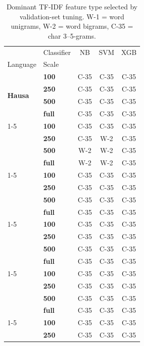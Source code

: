 \begin{table}[t]
\caption{Dominant TF-IDF feature type selected by validation-set tuning. W-1 = word unigrams, W-2 = word bigrams, C-35 = char 3--5-grams.}
\label{tab:feature_wins}
\begin{tabular}{llccc}
\toprule
 & Classifier & NB & SVM & XGB \\
Language & Scale &  &  &  \\
\midrule
\multirow[t]{4}{*}{\textbf{Hausa}} & \textbf{100} & C-35 & C-35 & C-35 \\
\textbf{} & \textbf{250} & C-35 & C-35 & C-35 \\
\textbf{} & \textbf{500} & C-35 & C-35 & C-35 \\
\textbf{} & \textbf{full} & C-35 & C-35 & C-35 \\
\cline{1-5}
\multirow[t]{4}{*}{\textbf{Igbo}} & \textbf{100} & C-35 & C-35 & C-35 \\
\textbf{} & \textbf{250} & C-35 & W-2 & C-35 \\
\textbf{} & \textbf{500} & W-2 & W-2 & C-35 \\
\textbf{} & \textbf{full} & W-2 & W-2 & C-35 \\
\cline{1-5}
\multirow[t]{4}{*}{\textbf{Luganda}} & \textbf{100} & C-35 & C-35 & C-35 \\
\textbf{} & \textbf{250} & C-35 & C-35 & C-35 \\
\textbf{} & \textbf{500} & C-35 & C-35 & C-35 \\
\textbf{} & \textbf{full} & C-35 & C-35 & C-35 \\
\cline{1-5}
\multirow[t]{4}{*}{\textbf{Oromo}} & \textbf{100} & C-35 & C-35 & C-35 \\
\textbf{} & \textbf{250} & C-35 & C-35 & C-35 \\
\textbf{} & \textbf{500} & C-35 & C-35 & C-35 \\
\textbf{} & \textbf{full} & C-35 & C-35 & C-35 \\
\cline{1-5}
\multirow[t]{4}{*}{\textbf{Rundi}} & \textbf{100} & C-35 & C-35 & C-35 \\
\textbf{} & \textbf{250} & C-35 & C-35 & C-35 \\
\textbf{} & \textbf{500} & C-35 & C-35 & C-35 \\
\textbf{} & \textbf{full} & C-35 & C-35 & C-35 \\
\cline{1-5}
\multirow[t]{4}{*}{\textbf{chiShona}} & \textbf{100} & C-35 & C-35 & C-35 \\
\textbf{} & \textbf{250} & C-35 & C-35 & C-35 \\

\end{tabular}
\end{table}
